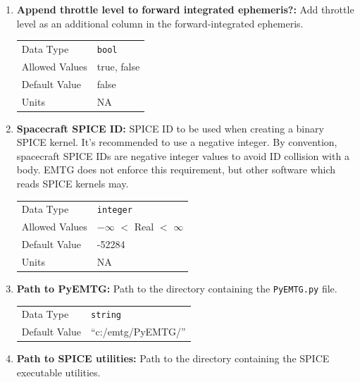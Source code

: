 \begin{enumerate}
\item{\textbf{Append throttle level to forward integrated ephemeris?:}} Add throttle level as an additional column in the forward-integrated ephemeris.
    \begin{table}[H]
        \hspace{2cm}
        \begin{tabular}{ll}
        Data Type & \verb|bool| \\
        Allowed Values & true, false \\
        Default Value & false \\
        Units & NA
        \end{tabular}
    \end{table}

\item{\textbf{Spacecraft \ac{SPICE} ID:}} \ac{SPICE} ID to be used when creating a binary \ac{SPICE} kernel. It's recommended to use a negative integer. By convention, spacecraft \ac{SPICE} IDs are negative integer values to avoid ID collision with a body. \ac{EMTG} does not enforce this requirement, but other software which reads \ac{SPICE} kernels may. 

    \begin{table}[H]
        \hspace{2cm}
        \begin{tabular}{ll}
        Data Type & \verb|integer| \\
        Allowed Values & $-\infty$ $<$ Real $<$ $\infty$ \\
        Default Value & -52284 \\
        Units & NA
        \end{tabular}
    \end{table}

\item{\textbf{Path to PyEMTG:}} Path to the directory containing the \verb|PyEMTG.py| file.

    \begin{table}[H]
        \hspace{2cm}
        \begin{tabular}{ll}
        Data Type & \verb|string| \\
        Default Value & ``c:/emtg/PyEMTG/'' \\
        \end{tabular}
    \end{table}

\item{\textbf{Path to \ac{SPICE} utilities:}} Path to the directory containing the \ac{SPICE} executable utilities.


\end{enumerate}
